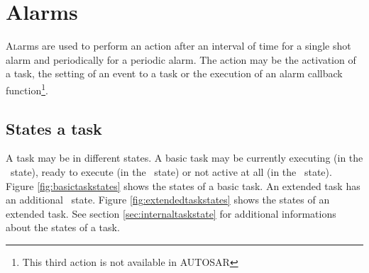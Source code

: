 
\chapter{Alarms}
\label{chap:alarms}

\lettrine{A}larms are used to perform an action after an interval of time for a single shot alarm and periodically for a periodic alarm. The action may be the activation of a task, the setting of an event to a task or the execution of an alarm callback function\footnote{This third action is not available in AUTOSAR}.



\section{States a task}
\label{sec:taskstate}

A task may be in different states. A basic task may be currently executing (in the \RUNNING\ state), ready to execute (in the \READY\ state) or not active at all (in the \SUSPENDED\ state). Figure \ref{fig:basictaskstates} shows the states of a basic task. An extended task has an additional \WAITING\ state.  Figure \ref{fig:extendedtaskstates} shows the states of an extended task. See section \ref{sec:internaltaskstate} for additional informations about the states of a task.

